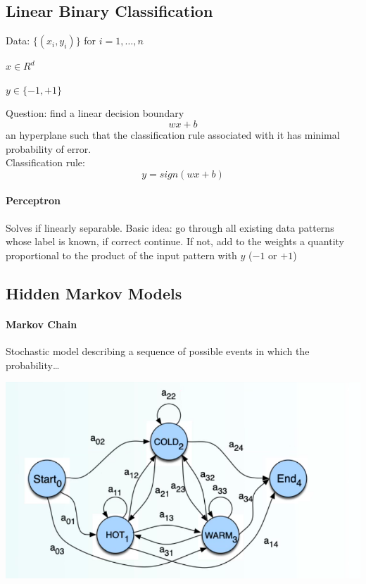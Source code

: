 \documentclass[10pt]{report}
\begin{document}
\subsection{Linear Binary Classification}
Data: $\{(x_i,y_i)\}$ for $i=1,\ldots,n$\begin{list}{}{}
	\item $x \in R^d$
	\item $y \in \{-1,+1\}$
\end{list}
Question: find a linear decision boundary $$wx + b$$ an hyperplane such that the classification rule associated with it has minimal probability of error.\\
Classification rule: $$y = sign(wx+b)$$
\paragraph{Perceptron} Solves if linearly separable. Basic idea: go through all existing data patterns whose label is known, if correct continue. If not, add to the weights a quantity proportional to the product of the input pattern with $y$ ($-1$ or $+1$)
\subsection{Hidden Markov Models}
\paragraph{Markov Chain} Stochastic model describing a sequence of possible events in which the probability\ldots %
\begin{center}
	\includegraphics[scale=0.5]{12.png}
\end{center}
\end{document}
